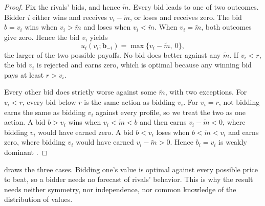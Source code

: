\begin{proof}
Fix the rivals' bids, and hence $\tilde m$. Every bid leads to one of two outcomes. Bidder $i$ either wins
and receives $v_i-\tilde m$, or loses and receives zero. The bid $b=v_i$ wins when $v_i>\tilde m$ and loses
when $v_i<\tilde m$. When $v_i=\tilde m$, both outcomes give zero. Hence the bid $v_i$ yields
\[
u_i(v_i;\bm b_{-i})=\max\{v_i-\tilde m,\ 0\},
\]
the larger of the two possible payoffs. No bid does better against any $\tilde m$. If $v_i<r$, the bid
$v_i$ is rejected and earns zero, which is optimal because any winning bid pays at least $r>v_i$.

Every other bid does strictly worse against some $\tilde m$, with two exceptions. For $v_i<r$, every bid
below $r$ is the same action as bidding $v_i$. For $v_i=r$, not bidding earns the same as bidding $v_i$
against every profile, so we treat the two as one action. A bid $b>v_i$ wins when
$v_i<\tilde m<b$ and then earns $v_i-\tilde m<0$, where bidding $v_i$ would have earned zero. A bid $b<v_i$
loses when $b<\tilde m<v_i$ and earns zero, where bidding $v_i$ would have earned $v_i-\tilde m>0$. Hence
$b_i=v_i$ is weakly dominant \citep{Vickrey1961}.
\end{proof}

 draws the three cases. Bidding one's value is optimal against every possible price
to beat, so a bidder needs no forecast of rivals' behavior. This is why the result needs neither symmetry,
nor independence, nor common knowledge of the distribution of values.

